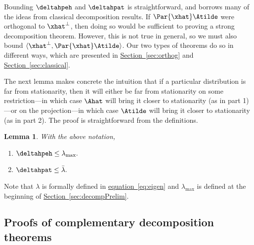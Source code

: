 \documentclass[11pt]{article}
\newtheorem{lemma}[theorem]{Lemma}
\providecommand{\expref}[2]{\texorpdfstring{\hyperref[#2]{#1~\ref{#2}}}{#1~\ref{#2}}}
\providecommand{\expeqref}[2]{\texorpdfstring{\hyperref[#2]{#1~\eqref{#2}}}{#1~\eqref{#2}}}
\providecommand{\Perp}[1]{#1^{\perp}}
\providecommand{\lambdabar}{\bar{\lambda}}
\begin{document}
Bounding  $\deltahpeh$ and $\deltahpat$ is straightforward, and borrows 
many of the ideas from classical decomposition results.  If 
$\Par{\xhat}\Atilde$ were orthogonal to $\Perp{\xhat}$, then doing so 
would be sufficient to proving a strong decomposition theorem.  
However, this is not true in general, so we must also bound 
$\langle\Perp{\xhat},\Par{\xhat}\Atilde\rangle$.  Our two types of 
theorems do so in different ways, which are presented in 
\expref{Section}{sec:orthog} and \expref{Section}{sec:classical}.

The next lemma makes concrete the intuition that if a particular 
distribution is far from stationarity, then it will either be far from 
stationarity on some restriction---in which case $\Ahat$ will bring it 
closer to stationarity (as in part 1)---or on the projection---in which 
case $\Atilde$ will bring it closer to stationarity (as in part 2).  
The proof is straightforward from the definitions. 

\begin{lemma}\label{lem:eta}
  With the above notation,
\begin{enumerate}
\item $\deltahpeh \leq \lambda_{\max}.$
\item $\deltahpat \leq \lambdabar.$
\end{enumerate}
\end{lemma}
\noindent Note that $\lambda$ is formally defined in \expeqref{equation}{eq:eigen} and $\lambda_{\max}$ is defined at the beginning of \expref{Section}{sec:decompPrelim}.

\subsection{Proofs of complementary decomposition theorems}\label{sec:tight}\label{sec:orthog}
\end{document}
